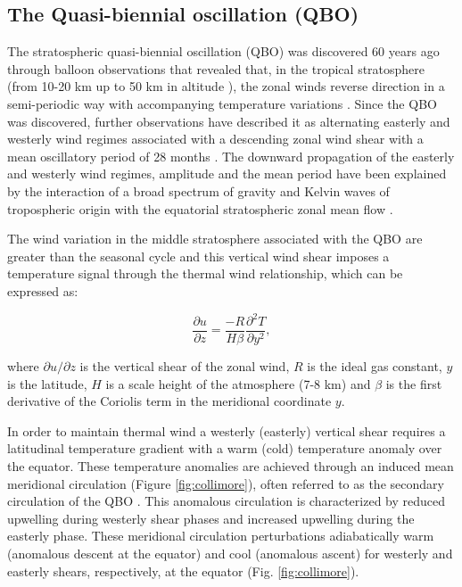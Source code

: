 \subsection{The Quasi-biennial oscillation (QBO)}

The stratospheric quasi-biennial oscillation (QBO) was discovered 60 years ago through balloon observations  that revealed that, in the tropical stratosphere (from 10-20 km up to 50 km in altitude \citep{andrews1987}), the zonal winds reverse direction in a semi-periodic way with accompanying temperature variations \citep{ebdon1960,reed1964}. Since the QBO was discovered, further observations have described it as alternating easterly and westerly wind regimes associated with a descending zonal wind shear with a mean oscillatory period of 28 months \citep{baldwin2001}. 
The downward propagation of the easterly and westerly wind regimes, amplitude and the mean period have been explained by the interaction of a broad spectrum of gravity and Kelvin waves of tropospheric origin with the equatorial stratospheric zonal mean flow  \citep{baldwin2001}.

The wind variation in the middle stratosphere associated with the QBO are greater than the seasonal cycle \citep{andrews1987} and this vertical wind shear imposes a temperature signal through the thermal wind relationship, which can be expressed as: 

\begin{equation}
\frac{\partial{u}}{\partial{z}}=\frac{-R}{H \beta}\frac{\partial^2 T}{\partial y^2}, 
\end{equation}

\noindent where $\partial u / \partial z$ is the vertical shear of the zonal wind, $R$ is the ideal gas constant, $y$ is the latitude, $H$ is a scale height of the atmosphere (7-8 km) and $\beta$ is the first derivative of the Coriolis term in the meridional coordinate $y$. 

In order to maintain thermal wind a westerly (easterly) vertical shear requires a latitudinal temperature gradient with a warm (cold) temperature anomaly over the equator. These temperature anomalies are achieved through an induced mean meridional circulation (Figure \ref{fig:collimore}), often referred to as the secondary circulation of the QBO \citep{plumb1982,li1995,baldwin2001,ribera2004}. This anomalous circulation is characterized by reduced upwelling during westerly shear phases and increased upwelling during the easterly phase. These meridional circulation perturbations adiabatically warm (anomalous descent at the equator) and cool (anomalous ascent) for westerly and easterly shears, respectively, at the equator (Fig. \ref{fig:collimore}). 


